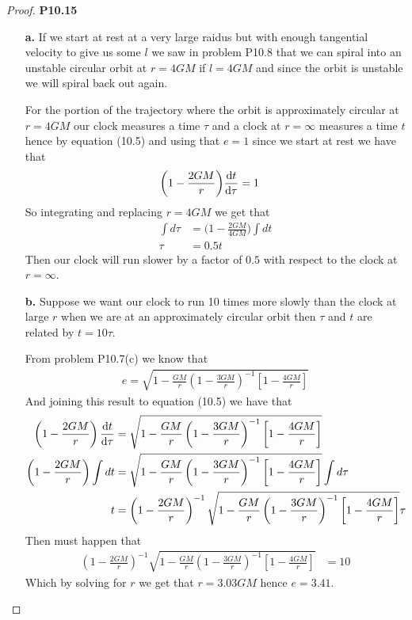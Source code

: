 \documentclass[11pt]{article}
\theoremstyle{definition}
\begin{document}
\cleardoublepage
\begin{proof}{\textbf{P10.15}}
\begin{itemize}
    \item [\textbf{a.}] If we start at rest at a very large raidus but with
    enough tangential velocity to give us some $l$ we saw in problem P10.8
    that we can spiral into an unstable circular orbit at $r = 4GM$ if
    $l = 4GM$ and since the orbit is unstable we will spiral back out again.
    
    For the portion of the trajectory where the orbit is approximately circular
    at $r = 4GM$ our clock measures a time $\tau$ and a clock at $r=\infty$
    measures a time $t$ hence by equation (10.5) and using that $e= 1$ since
    we start at rest we have that
    \begin{align*}
        \bigg(1 -\frac{2GM}{r}\bigg)\dv{t}{\tau} &= 1
    \end{align*}
    So integrating and replacing $r = 4GM$ we get that
    \begin{align*}
        \int d\tau &= \bigg(1 -\frac{2GM}{4GM}\bigg)\int dt\\
        \tau &= 0.5 t
    \end{align*}
    Then our clock will run slower by a factor of $0.5$ with respect to the
    clock at $r = \infty$.

    \item [\textbf{b.}] Suppose we want our clock to run 10 times more slowly 
    than the clock at large $r$ when we are at an approximately circular orbit
    then $\tau$ and $t$ are related by $t = 10\tau$.

    From problem P10.7(c) we know that 
    \begin{align*}
        e = \sqrt{1 - \frac{GM}{r}\left(1 - \frac{3GM}{r}\right)^{-1}
        \left[1 - \frac{4GM}{r}\right]}
    \end{align*}
    And joining this result to equation (10.5) we have that 
    \begin{align*}
        \left(1 - \frac{2GM}{r}\right)\dv{t}{\tau}
        &= \sqrt{1 - \frac{GM}{r}\left(1 - \frac{3GM}{r}\right)^{-1}
        \left[1 - \frac{4GM}{r}\right]}\\
        \left(1 - \frac{2GM}{r}\right)\int dt
        &= \sqrt{1 - \frac{GM}{r}\left(1 - \frac{3GM}{r}\right)^{-1}
        \left[1 - \frac{4GM}{r}\right]}\int d\tau \\
        t &= \left(1 - \frac{2GM}{r}\right)^{-1} 
        \sqrt{1 - \frac{GM}{r}\left(1 - \frac{3GM}{r}\right)^{-1}
        \left[1 - \frac{4GM}{r}\right]} \tau
    \end{align*}
    Then must happen that 
    \begin{align*}
        \left(1 - \frac{2GM}{r}\right)^{-1} 
        \sqrt{1 - \frac{GM}{r}\left(1 - \frac{3GM}{r}\right)^{-1}
        \left[1 - \frac{4GM}{r}\right]} &= 10
    \end{align*}
    Which by solving for $r$ we get that $r = 3.03GM$ hence $e = 3.41$.


\end{itemize}
\end{proof}
\end{document}
